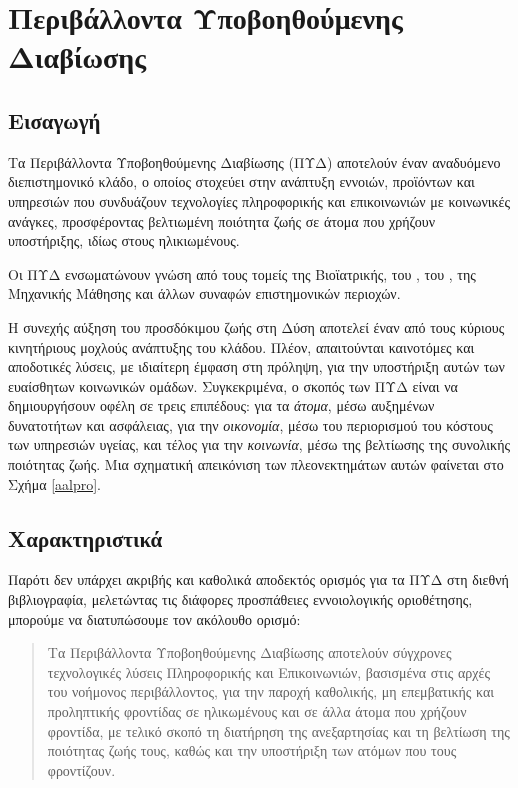 \chapter{Περιβάλλοντα Υποβοηθούμενης Διαβίωσης}
\label{chap2}
\section{Εισαγωγή}
Τα Περιβάλλοντα Υποβοηθούμενης Διαβίωσης (ΠΥΔ) αποτελούν έναν αναδυόμενο διεπιστημονικό κλάδο, ο οποίος στοχεύει στην ανάπτυξη εννοιών, προϊόντων και υπηρεσιών που συνδυάζουν τεχνολογίες πληροφορικής και επικοινωνιών με κοινωνικές ανάγκες, προσφέροντας βελτιωμένη ποιότητα ζωής σε άτομα που χρήζουν υποστήριξης, ιδίως στους ηλικιωμένους.

Οι ΠΥΔ ενσωματώνουν γνώση από τους τομείς της Βιοϊατρικής, του , του , της Μηχανικής Μάθησης και άλλων συναφών επιστημονικών περιοχών.
\par
Η συνεχής αύξηση του προσδόκιμου ζωής στη Δύση αποτελεί έναν από τους κύριους κινητήριους μοχλούς ανάπτυξης του κλάδου.
Πλέον, απαιτούνται καινοτόμες και αποδοτικές λύσεις, με ιδιαίτερη έμφαση στη πρόληψη, για την υποστήριξη αυτών των ευαίσθητων κοινωνικών ομάδων.
Συγκεκριμένα, ο σκοπός των ΠΥΔ είναι να δημιουργήσουν οφέλη σε τρεις επιπέδους: για τα \textit{άτομα}, μέσω αυξημένων δυνατοτήτων και ασφάλειας, για την \textit{οικονομία}, μέσω του περιορισμού του κόστους των υπηρεσιών υγείας, και τέλος για την \textit{κοινωνία}, μέσω της βελτίωσης της συνολικής ποιότητας ζωής. Μια σχηματική απεικόνιση των πλεονεκτημάτων αυτών φαίνεται στο Σχήμα \ref{aalpro}. 

\section{Χαρακτηριστικά}
Παρότι δεν υπάρχει ακριβής και καθολικά αποδεκτός ορισμός για τα ΠΥΔ στη διεθνή βιβλιογραφία, μελετώντας τις διάφορες προσπάθειες εννοιολογικής οριοθέτησης, μπορούμε να διατυπώσουμε τον ακόλουθο ορισμό:
\begin{quote}
    Τα Περιβάλλοντα Υποβοηθούμενης Διαβίωσης αποτελούν σύγχρονες τεχνολογικές λύσεις Πληροφορικής και Επικοινωνιών, βασισμένα στις αρχές του νοήμονος περιβάλλοντος, για την παροχή καθολικής, μη επεμβατικής και προληπτικής φροντίδας σε ηλικωμένους και σε άλλα άτομα που χρήζουν φροντίδα, με τελικό σκοπό τη διατήρηση της ανεξαρτησίας και τη βελτίωση της ποιότητας ζωής τους, καθώς και την υποστήριξη των ατόμων που τους φροντίζουν. 
\end{quote}

